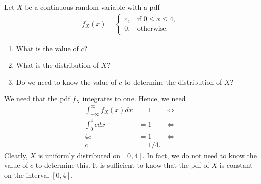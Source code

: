 \begin{exercise}
Let $X$ be a continuous random variable with a pdf
\begin{align}
    f_X(x) = \begin{cases}
    c, &\text{if } 0 \leq x \leq 4, \\
    0, &\text{otherwise}.
    \end{cases}
\end{align}
\begin{enumerate}
    \item What is the value of $c$?
    \item What is the distribution of $X$?
    \item Do we need to know the value of $c$ to determine the distribution of $X$?
\end{enumerate}

\begin{solution}
We need that the pdf $f_X$ integrates to one. Hence, we need
\begin{align}
    \int_{-\infty}^\infty f_X(x) dx &= 1 \qquad \iff \\
    \int_{0}^4 c dx &= 1 \qquad \iff \\
    4c &= 1 \qquad \iff \\
    c &= 1/4.
\end{align}
Clearly, $X$ is uniformly distributed on $[0,4]$. In fact, we do not need to know the value of $c$ to determine this. It is sufficient to know that the pdf of $X$ is constant on the interval $[0,4]$.
\end{solution}
\end{exercise}

